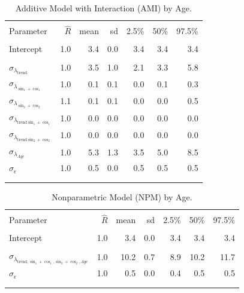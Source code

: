 \documentclass{article}\usepackage[]{graphicx}\usepackage[]{color}
\begin{document}
\begin{table}[!htbp]
\caption{Additive Model with Interaction (AMI) by Age.}
\label{ami_age}
\centering
\begin{tabular}{lrrrrrr}
\\[-1.8ex]\hline 
\hline \\[-1.8ex] 
Parameter & $\hat{R}$  & mean & sd & 2.5\% & 50\% & 97.5\% \\ 
\hline \\[-1.8ex] 
Intercept & 1.0 & 3.4 & 0.0 & 3.4 & 3.4 & 3.4 \\ 
\hline \\[-1.8ex] 
$\sigma_{\lambda_{\text{trend}}}$    & 1.0  & 3.5 & 1.0 & 2.1 & 3.3 & 5.8 \\  
$\sigma_{\lambda_{\sin_{1}+\cos_{1}}}$ & 1.0 & 0.1 & 0.1 & 0.0 & 0.1 & 0.3 \\  
$\sigma_{\lambda_{\sin_{2}+\cos_{2}}}$  & 1.1 & 0.1 & 0.1 & 0.0 & 0.0 & 0.5 \\ 
$\sigma_{\lambda_{\text{trend} \sin_{1}+\cos_{1}}}$  & 1.0 & 0.0 & 0.0 & 0.0 & 0.0 & 0.0 \\  
$\sigma_{\lambda_{\text{trend} \sin_{2}+\cos_{2}}}$  & 1.0 & 0.0 & 0.0 & 0.0 & 0.0 & 0.0 \\  
$\sigma_{\lambda_{Age}}$ & 1.0 & 5.3 & 1.3 & 3.5 & 5.0 & 8.5 \\ 
$\sigma_{\epsilon}$                   & 1.0 & 0.5 & 0.0 & 0.5 & 0.5 & 0.5 \\  
\\[-1.8ex]\hline 
\hline \\[-1.8ex] 
\end{tabular}
\end{table}


\begin{table}[!htbp]
\caption{Nonparametric Model (NPM) by Age.}
\label{npm_age}
\centering
\begin{tabular}{lrrrrrr}
\\[-1.8ex]\hline 
\hline \\[-1.8ex] 
Parameter & $\hat{R}$  & mean & sd & 2.5\% & 50\% & 97.5\% \\ 
\hline \\[-1.8ex] 
Intercept & 1.0 & 3.4 & 0.0 & 3.4 & 3.4 & 3.4 \\ 
\hline \\[-1.8ex] 
$\sigma_{\lambda_{\text{trend}, \sin_{1}+\cos_{1}, \sin_{2}+\cos_{2}, Age}}$   & 1.0 & 10.2 & 0.7 & 8.9 & 10.2 & 11.7 \\ 
$\sigma_{\epsilon}$  & 1.0 & 0.5 & 0.0 & 0.4 & 0.5 & 0.5 \\ 
\\[-1.8ex]\hline 
\hline \\[-1.8ex] 
\end{tabular}
\end{table}
\end{document}
